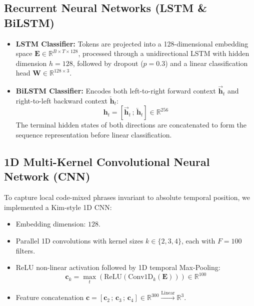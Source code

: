 \documentclass[11pt,a4paper]{article}
\begin{document}
\subsection{Recurrent Neural Networks (LSTM \& BiLSTM)}
\begin{itemize}
    \item \textbf{LSTM Classifier:} Tokens are projected into a 128-dimensional embedding space $\mathbf{E} \in \mathbb{R}^{B \times T \times 128}$, processed through a unidirectional LSTM with hidden dimension $h = 128$, followed by dropout ($p=0.3$) and a linear classification head $\mathbf{W} \in \mathbb{R}^{128 \times 3}$.
    \item \textbf{BiLSTM Classifier:} Encodes both left-to-right forward context $\overrightarrow{\mathbf{h}}_t$ and right-to-left backward context $\overleftarrow{\mathbf{h}}_t$:
    \begin{equation}
        \mathbf{h}_t = \left[ \overrightarrow{\mathbf{h}}_t \,;\, \overleftarrow{\mathbf{h}}_t \right] \in \mathbb{R}^{256}
    \end{equation}
    The terminal hidden states of both directions are concatenated to form the sequence representation before linear classification.
\end{itemize}

\subsection{1D Multi-Kernel Convolutional Neural Network (CNN)}
To capture local code-mixed phrases invariant to absolute temporal position, we implemented a Kim-style 1D CNN:
\begin{itemize}
    \item Embedding dimension: $128$.
    \item Parallel 1D convolutions with kernel sizes $k \in \{2, 3, 4\}$, each with $F = 100$ filters.
    \item ReLU non-linear activation followed by 1D temporal Max-Pooling:
    \begin{equation}
        \mathbf{c}_k = \max_{t} \left( \text{ReLU}(\text{Conv1D}_k(\mathbf{E})) \right) \in \mathbb{R}^{100}
    \end{equation}
    \item Feature concatenation $\mathbf{c} = [\mathbf{c}_2 \,;\, \mathbf{c}_3 \,;\, \mathbf{c}_4] \in \mathbb{R}^{300} \xrightarrow{\text{Linear}} \mathbb{R}^3$.
\end{itemize}
\end{document}
